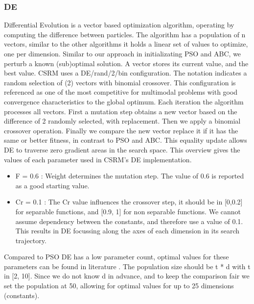 \subsubsection{DE}
Differential Evolution is a vector based optimization algorithm, operating by computing the difference between particles. The algorithm has a population of n vectors, similar to the other algorithms it holds a linear set of values to optimize, one per dimension. Similar to our approach in initializating PSO and ABC, we perturb a known (sub)optimal solution. A vector stores its current value, and the best value. CSRM uses a DE/rand/2/bin configuration. The notation indicates a random selection of (2) vectors with binomial crossover. This configuration is referenced \cite{DE} as one of the most competitive for multimodal problems with good convergence characteristics to the global optimum. Each iteration the algorithm processes all vectors. First a mutation step obtains a new vector based on the difference of 2 randomly selected, with replacement. Then we apply a binomial crossover operation. Finally we compare the new vector replace it if it has the same or better fitness, in contrast to PSO and ABC. This equality update allows DE to traverse zero gradient areas in the search space.
This overview gives the values of each parameter used in CSRM's DE implementation.
\begin{itemize}
\item F = 0.6 : Weight determines the mutation step. The value of 0.6 is reported as a good starting value\citep{DESurveyLatest}. 
\item Cr = 0.1 : The Cr value influences the crossover step, it should be in [0,0.2] for separable functions, and [0.9, 1] for non separable functions. We cannot assume dependency between the constants, and therefore use a value of 0.1. This results in DE focussing along the axes of each dimension in its search trajectory. 
\end{itemize}
Compared to PSO DE has a low parameter count, optimal values for these parameters can be found in literature \cite{DESurveyLatest}. The population size should be t * d with t in [2, 10]. Since we do not know d in advance, and to keep the comparison fair we set the population at 50, allowing for optimal values for up to 25 dimensions (constants).